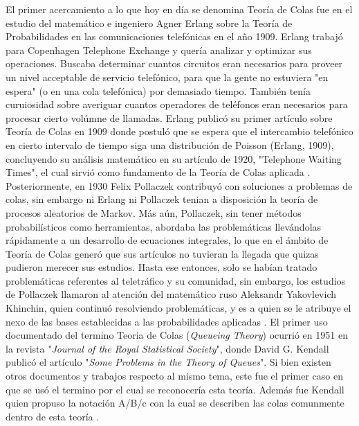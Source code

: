 \noindent El primer acercamiento a lo que hoy en día se denomina Teoría de Colas fue en el estudio del matemático e ingeniero Agner Erlang sobre la Teoría de Probabilidades en las comunicaciones telefónicas en el año 1909. Erlang trabajó para Copenhagen Telephone Exchange y quería analizar y optimizar sus operaciones. Buscaba determinar cuantos circuitos eran necesarios para proveer un nivel acceptable de servicio telefónico, para que la gente no estuviera "en espera" (o en una cola telefónica) por demasiado tiempo. También tenía curuiosidad sobre averiguar cuantos operadores de teléfonos eran necesarios para procesar cierto volúmne de llamadas. Erlang publicó su primer artículo sobre Teoría de Colas en 1909 donde postuló que se espera que el intercambio telefónico en cierto intervalo de tiempo siga una distribución de Poisson (Erlang, 1909), concluyendo su análisis matemático en su artículo de 1920, "Telephone Waiting Times", el cual sirvió como fundamento de la Teoría de Colas aplicada \citep{queueit2021} \citep{hlynka2017} \citep{mandelbaum2009} \citep{shortle2018}.
\newline \newline
Posteriormente, en 1930 Felix Pollaczek contribuyó con soluciones a problemas de colas, sin embargo ni Erlang ni Pollaczek tenian a disposición la teoría de procesos aleatorios de Markov. Más aún, Pollaczek, sin tener métodos probabilísticos como herramientas, abordaba las problemáticas llevándolas rápidamente a un desarrollo de ecuaciones integrales, lo que en el ámbito de Teoría de Colas generó que sus artículos no tuvieran la llegada que quizas pudieron merecer sus estudios. Hasta ese entonces, solo se habían tratado problemáticas referentes al teletráfico y su comunidad, sin embargo, los estudios de Pollaczek llamaron al atención del matemático ruso Aleksandr Yakovlevich Khinchin, quien continuó resolviendo problemáticas, y es a quien se le atribuye el nexo de las bases establecidas a las probabilidades aplicadas \citep{shortle2018}.
\newline \newline
El primer uso documentado del termino Teoria de Colas (\textit{Queueing Theory}) ocurrió en 1951 en la revista "\textit{Journal of the Royal Statistical Society}", donde David G. Kendall publicó el artículo "\textit{Some Problems in the Theory of Queues}". Si bien existen otros documentos y trabajos respecto al mismo tema, este fue el primer caso en que se usó el termino por el cual se reconocería esta teoría. Además fue Kendall quien propuso la notación A/B/c con la cual se describen las colas comunmente dentro de esta teoría \citep{hlynka2017}.
